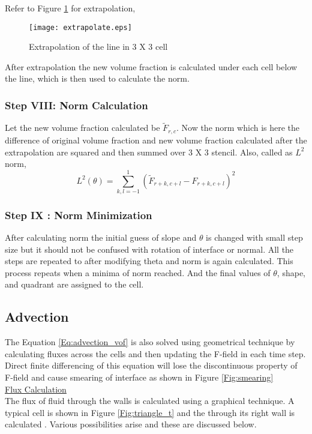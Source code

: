 Refer to Figure \ref{Fig:extrapolation} for extrapolation,

\begin{figure}%
 \centering
 \texttt{[image: extrapolate.eps]}
 \caption{Extrapolation of the line in 3 X 3 cell}
 \label{Fig:extrapolation}
\end{figure}

After extrapolation the new volume fraction is calculated under each cell below the line, which is then used to calculate the norm.
\subsubsection{Step VIII: Norm Calculation}
Let the new volume fraction calculated be $\widetilde F_{r,c}$. Now the norm which is here the difference of original volume fraction and new 
volume fraction calculated after the extrapolation are squared and then summed over 3 X 3 stencil. Also, called as $L^2$ norm, \\
\begin{equation*}
 \boxed{L^2(\theta) =  \sum_{k,l=-1}^{1}(\widetilde F_{r+k,c+l}-F_{r+k,c+l})^2}
\end{equation*}

\subsubsection{Step IX : Norm Minimization}
After calculating norm the initial guess of slope and $\theta$ is changed with small step size but it should not be confused with rotation of interface or normal.
All the steps are repeated to after modifying theta and norm is again calculated. This process repeats when a minima of norm reached. And the final values of $\theta$,
shape, and quadrant are assigned to the cell.

\subsection{Advection}
The Equation \ref{Eq:advection_vof} is also solved using geometrical technique by calculating fluxes across the cells and then updating the F-field in each time step. Direct finite differencing
of this equation will lose the discontinuous property of F-field and cause smearing of interface as shown in Figure \ref{Fig:smearing}\\
% 
\underline{Flux Calculation}\\
The flux of fluid through the walls is calculated using a graphical technique. A typical cell is shown in Figure \ref{Fig:triangle_t} and the through its right wall is calculated .
Various possibilities arise and these are discussed below.
